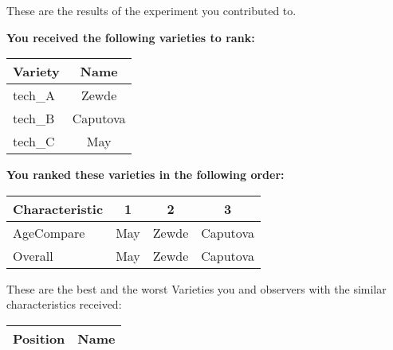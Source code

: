 \documentclass[10pt]{article}
\begin{document}
\begin{titlepage}
	These are the results of the experiment you contributed to.

	\begin{flushleft}
		\textbf{You received the following varieties to rank: }\hfill \break
		\begin{tabularx}{\textwidth}{ X | c  }
			\hline
			\textbf{Variety} & \textbf{Name} \\ \hline

			
				tech\_A & Zewde \\ \hline
			
				tech\_B & Caputova \\ \hline
			
				tech\_C & May \\ \hline
			


		\end{tabularx}\newline \newline

		\textbf{You ranked these varieties in the following order: }\hfill \break
		\begin{tabularx}{\textwidth}{ X | c | c | c  }
			\hline
			\textbf{Characteristic}
			
				& \textbf{ 1 }
			
				& \textbf{ 2 }
			
				& \textbf{ 3 }
			
			\\ \hline


			
				AgeCompare & May  & Zewde  & Caputova  \\ \hline


			
				Overall & May  & Zewde  & Caputova  \\ \hline


			

		\end{tabularx}

	\end{flushleft}

	\pagebreak

	\begin{flushleft}
		These are the best and the worst Varieties you and observers with the similar characteristics received:\hfill \break \newline
		\begin{tabularx}{\textwidth}{ X | X  }
			\hline
			\textbf{Position} & \textbf{Name} \\ \hline


\end{tabularx}
\end{flushleft}
\end{titlepage}
\end{document}
